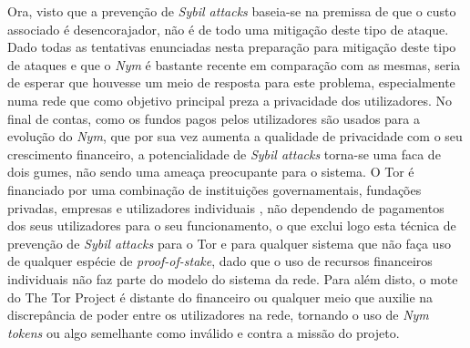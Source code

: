 Ora, visto que a prevenção de \textit{Sybil attacks} baseia-se na premissa de que o custo associado é desencorajador, não é de todo uma mitigação deste tipo de ataque. Dado todas as tentativas enunciadas nesta preparação para mitigação deste tipo de ataques e que o \textit{Nym} é bastante recente em comparação com as mesmas, seria de esperar que houvesse um meio de resposta para este problema, especialmente numa rede que como objetivo principal preza a privacidade dos utilizadores. No final de contas, como os fundos pagos pelos utilizadores são usados para a evolução do \textit{Nym}, que por sua vez aumenta a qualidade de privacidade com o seu crescimento financeiro, a potencialidade de \textit{Sybil attacks} torna-se uma faca de dois gumes, não sendo uma ameaça preocupante para o sistema. O Tor é financiado por uma combinação de instituições governamentais, fundações privadas, empresas e utilizadores individuais \cite{tor_supporters}, não dependendo de pagamentos dos seus utilizadores para o seu funcionamento, o que exclui logo esta técnica de prevenção de \textit{Sybil attacks} para o Tor e para qualquer sistema que não faça uso de qualquer espécie de \textit{proof-of-stake}, dado que o uso de recursos financeiros individuais não faz parte do modelo do sistema da rede. Para além disto, o mote do The Tor Project é distante do financeiro ou qualquer meio que auxilie na discrepância de poder entre os utilizadores na rede, tornando o uso de \textit{Nym tokens} ou algo semelhante como inválido e contra a missão do projeto.

